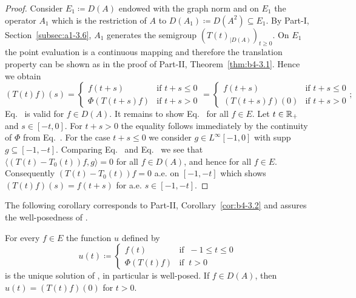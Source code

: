 \begin{proof}
Consider $E_1 \coloneq D(A)$ endowed with the graph norm 
and on $E_1$ the operator $A_1$ which is the restriction of\/ $A$ to $D(A_1) \coloneq D(A^{2})\subseteq E_1$.
By 
Part-I, Section~\ref{subsec:a1-3.6}, $A_1$ generates the semigroup $(T(t)_{|D(A)})_{t \geq 0}$.
On $E_1$ the point evaluation is a continuous mapping and therefore the translation property can be shown as in the proof of Part-II, Theorem~\ref{thm:b4-3.1}.
Hence we obtain
\begin{equation}\label{eq:c4-3.4}
(T(t)f)(s)= \begin{cases}
    f(t+s) &\text{if } t+s \leq 0 \\
    \Phi(T(t+s)f) &\text{if } t+s > 0
\end{cases} = \begin{cases}
    f(t+s) &\text{if } t+s \leq 0 \\
    (T(t+s)f)(0) &\text{if } t+s > 0
\end{cases};
\end{equation}
\ie Eq.~ is valid for $f \in D(A)$.
It remains to show Eq.~ for all $f \in E$.
Let $t \in \mathbb{R}_+$ and $s \in [-t,0]$.
For $t + s > 0$ the equality follows immediately by the continuity of\/ $\Phi$ from Eq.~.
For the case $t + s \leq 0$ we consider $g \in L^{\infty}[-1,0]$ with supp $g \subseteq [-1,-t]$.
Comparing Eq.~ and Eq.~ we see that $\langle(T(t)-T_0(t))f,g\rangle = 0$ for all $f \in D(A)$, and hence for all $f \in E$.
Consequently $(T(t)-T_{0}(t))f = 0$ a.e. on $[-1,-t]$ which shows $(T(t)f)(s) = f(t+s)$ for a.e. $s \in [-1,-t]$.
\end{proof}
The following corollary corresponds to Part-II, Corollary~\ref{cor:b4-3.2} and assures the well-posed\-ness of .
\begin{corollary}\label{cor:c4-3.2}
%
For every $f \in E$ the function $u$ defined by
\begin{equation}\label{eq:c4-3.5}
u(t) \coloneq  \begin{cases}
    f(t) & \text{if } \ -1 \leq t \leq 0 \\
    \Phi(T(t)f) & \text{if } \ t > 0
\end{cases}
\end{equation}
is the unique solution of , in particular  is well-posed.
If\/ $f \in D(A)$, then $u(t) = (T(t)f)(0)$ for $t > 0$.
\end{corollary}
